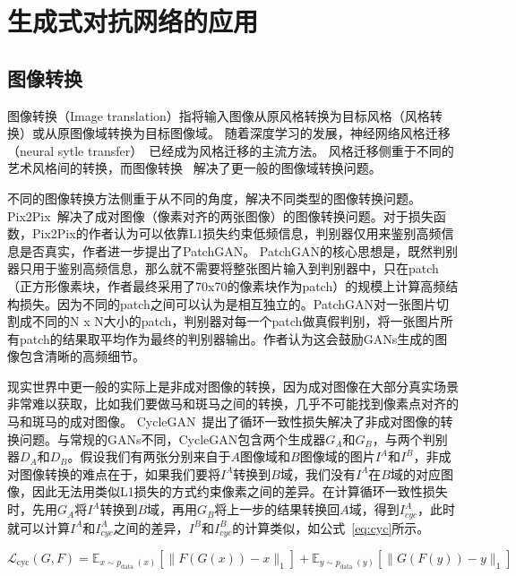 \section{生成式对抗网络的应用}

\subsection{图像转换}

图像转换（Image translation）指将输入图像从原风格转换为目标风格（风格转换）或从原图像域转换为目标图像域。 随着深度学习的发展，神经网络风格迁移（neural sytle transfer）~\cite{transfer0,transfer1,transfer2}已经成为风格迁移的主流方法。 风格迁移侧重于不同的艺术风格间的转换，而图像转换~\cite{i2i0,i2i1,i2i2,cyclegan} 解决了更一般的图像域转换问题。

不同的图像转换方法侧重于从不同的角度，解决不同类型的图像转换问题。Pix2Pix~\cite{pix2pix}解决了成对图像（像素对齐的两张图像）的图像转换问题。对于损失函数，Pix2Pix的作者认为可以依靠L1损失约束低频信息，判别器仅用来鉴别高频信息是否真实，作者进一步提出了PatchGAN。 PatchGAN的核心思想是，既然判别器只用于鉴别高频信息，那么就不需要将整张图片输入到判别器中，只在patch（正方形像素块，作者最终采用了70x70的像素块作为patch）的规模上计算高频结构损失。因为不同的patch之间可以认为是相互独立的。PatchGAN对一张图片切割成不同的N x N大小的patch，判别器对每一个patch做真假判别，将一张图片所有patch的结果取平均作为最终的判别器输出。作者认为这会鼓励GANs生成的图像包含清晰的高频细节。

现实世界中更一般的实际上是非成对图像的转换，因为成对图像在大部分真实场景非常难以获取，比如我们要做马和斑马之间的转换，几乎不可能找到像素点对齐的马和斑马的成对图像。
CycleGAN~\cite{cyclegan}提出了循环一致性损失解决了非成对图像的转换问题。与常规的GANs不同，CycleGAN包含两个生成器$G_A$和$G_B$，与两个判别器$D_A$和$D_B$。假设我们有两张分别来自于$A$图像域和$B$图像域的图片$I^A$和$I^B$，非成对图像转换的难点在于，如果我们要将$I^A$转换到$B$域，我们没有$I^A$在$B$域的对应图像，因此无法用类似L1损失的方式约束像素之间的差异。在计算循环一致性损失时，先用$G_A$将$I^A$转换到$B$域，再用$G_B$将上一步的结果转换回$A$域，得到$I^A_{cyc}$，此时就可以计算$I^A$和$I^A_{cyc}$之间的差异，$I^B$和$I^B_{cyc}$的计算类似，如公式~\ref{eq:cyc}所示。

\begin{equation}
    \mathcal{L}_{\mathrm{cyc}}(G, F) =\mathbb{E}_{x \sim p_{\text {data }}(x)}\left[\|F(G(x))-x\|_{1}\right] +\mathbb{E}_{y \sim p_{\text {data }}(y)}\left[\|G(F(y))-y\|_{1}\right]
    \label{eq:cyc}
\end{equation}

